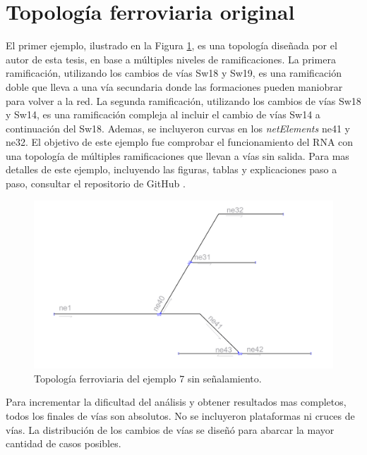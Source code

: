 \section{Topología ferroviaria original}

	El primer ejemplo, ilustrado en la Figura \ref{fig:EJ7_1}, es una topología diseñada por el autor de esta tesis, en base a múltiples niveles de ramificaciones. La primera ramificación, utilizando los cambios de vías Sw18 y Sw19, es una ramificación doble que lleva a una vía secundaria donde las formaciones pueden maniobrar para volver a la red. La segunda ramificación, utilizando los cambios de vías Sw18 y Sw14, es una ramificación compleja al incluir el cambio de vías Sw14 a continuación del Sw18. Ademas, se incluyeron curvas en los \textit{netElements} ne41 y ne32. El objetivo de este ejemplo fue comprobar el funcionamiento del RNA con una topología de múltiples ramificaciones que llevan a vías sin salida.	Para mas detalles de este ejemplo, incluyendo las figuras, tablas y explicaciones paso a paso, consultar el repositorio de GitHub \cite{GITHUB_PHD}.
	
	\begin{figure}[h]
		\centering
		\includegraphics[width=1\textwidth]{resultados-obtenidos/ejemplo7/images/7_empty.png}
		\centering\caption{Topología ferroviaria del ejemplo 7 sin señalamiento.}
		\label{fig:EJ7_1}
	\end{figure}
	
	Para incrementar la dificultad del análisis y obtener resultados mas completos, todos los finales de vías son absolutos. No se incluyeron plataformas ni cruces de vías. La distribución de los cambios de vías se diseñó para abarcar la mayor cantidad de casos posibles.